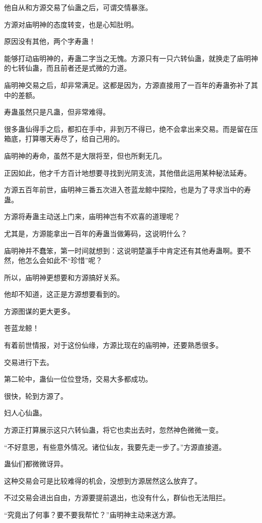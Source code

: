 \begin{this_body}
他自从和方源交易了仙蛊之后，可谓交情暴涨。

方源对庙明神的态度转变，也是心知肚明。

原因没有其他，两个字寿蛊！

能够打动庙明神的，寿蛊二字当之无愧。方源只有一只六转仙蛊，就换走了庙明神的七转仙蛊，而且前者还是式微的力道。

庙明神交易之后，却非常满足。这都是因为，方源直接用了一百年的寿蛊弥补了其中的差额。

寿蛊虽然只是凡蛊，但非常难得。

很多蛊仙得手之后，都扣在手中，非到万不得已，绝不会拿出来交易。而是留在压箱底，打算哪天寿尽了，给自己用的。

庙明神的寿命，虽然不是大限将至，但也所剩无几。

正因如此，他才千方百计地想要寻找到光阴支流，其他借此运用某种秘法延寿。

方源五百年前世，庙明神三番五次进入苍蓝龙鲸中探险，也是为了寻求当中的寿蛊。

方源将寿蛊主动送上门来，庙明神岂有不欢喜的道理呢？

尤其是，方源能拿出一百年的寿蛊当做筹码，这说明什么？

庙明神并不蠢笨，第一时间就想到：这说明楚瀛手中肯定还有其他寿蛊啊。要不然，他怎么会如此不“珍惜”呢？

所以，庙明神更想要和方源搞好关系。

他却不知道，这正是方源想要看到的。

方源图谋的更大更多。

苍蓝龙鲸！

有着前世情报，对于这份仙缘，方源比现在的庙明神，还要熟悉很多。

交易进行下去。

第二轮中，蛊仙一位位登场，交易大多都成功。

很快，轮到方源了。

妇人心仙蛊。

方源正打算展示这只六转仙蛊，将它也卖出去时，忽然神色微微一变。

“不好意思，有些意外情况。诸位仙友，我要先走一步了。”方源直接道。

蛊仙们都微微讶异。

这种交易会可是比较难得的机会，没想到方源居然这么放弃了。

不过交易会进出自由，方源要提前退出，也没有什么，群仙也无法阻拦。

“究竟出了何事？要不要我帮忙？”庙明神主动来送方源。


\end{this_body}
